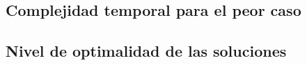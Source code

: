 \subsection{Complejidad temporal para el peor caso}
\subsection{Nivel de optimalidad de las soluciones}%

